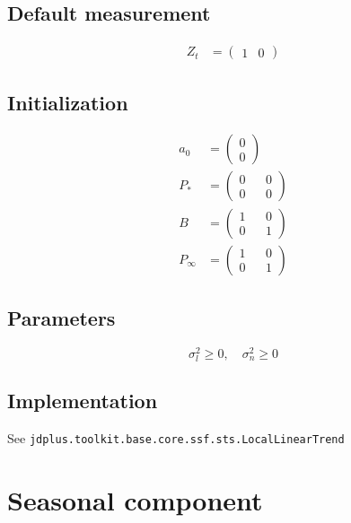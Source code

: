 \documentclass[
  letterpaper,
  DIV=11,
  numbers=noendperiod]{scrreprt}
\begin{document}
\subsection{Default measurement}\label{default-measurement-5}

\[
\begin{align*}
Z_t &= \begin{pmatrix} 1 & 0 \end{pmatrix} 
\end{align*} 
\]

\subsection{Initialization}\label{initialization-5}

\[
\begin{align*}
a_0 &= \begin{pmatrix} 0 \\ 0  \end{pmatrix} \\
P_* &=  \begin{pmatrix} 0 && 0 \\ 0 && 0 \end{pmatrix}\\
B &= \begin{pmatrix} 1 && 0 \\ 0 && 1 \end{pmatrix} \\
P_{\infty} &= \begin{pmatrix} 1 && 0 \\ 0 && 1 \end{pmatrix}
\end{align*}
\]

\subsection{Parameters}\label{parameters}

\[ \sigma^2_l \ge 0,\quad \sigma^2_n \ge 0 \]

\subsection{Implementation}\label{implementation-2}

See \texttt{jdplus.toolkit.base.core.ssf.sts.LocalLinearTrend}

\section{Seasonal component}\label{seasonal-component}
\end{document}
